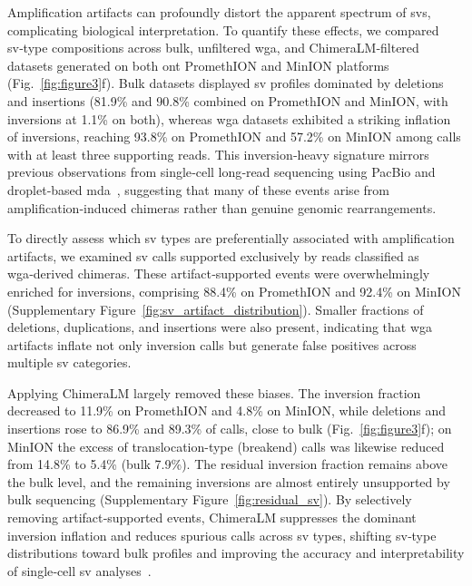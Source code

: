 \documentclass[pdflatex,lineno]{sn-jnl}%
\newif\ifrevisedtext
\newcommand{\chg}[1]{\ifrevisedtext\textcolor{revcolor}{#1}\else#1\fi}
\begin{document}
Amplification artifacts can profoundly distort the apparent spectrum of \glspl{sv}, complicating biological interpretation.
To quantify these effects, we compared \gls{sv}‑type compositions across bulk, unfiltered \gls{wga}, and ChimeraLM‑filtered datasets generated on both \gls{ont} PromethION and MinION platforms (Fig.~\ref{fig:figure3}f).
Bulk datasets displayed \gls{sv} profiles dominated by deletions and insertions\chg{ (81.9\% and 90.8\% combined on PromethION and MinION, with inversions at 1.1\% on both)}, whereas \gls{wga} datasets exhibited a striking inflation of inversions, reaching \chg{93.8\% on PromethION and 57.2\% on MinION among calls with at least three supporting reads}.
This inversion‑heavy signature mirrors previous observations from single‑cell long‑read sequencing using PacBio and droplet‑based \gls{mda}~\cite{hardLongreadWholegenomeAnalysis2023a}, suggesting that many of these events arise from amplification‑induced chimeras rather than genuine genomic rearrangements.

To directly assess which \gls{sv} types are preferentially associated with amplification artifacts, we examined \gls{sv} calls supported exclusively by reads classified as \gls{wga}‑derived chimeras.
These artifact‑supported events were overwhelmingly enriched for inversions, comprising 88.4\% on PromethION and 92.4\% on MinION (Supplementary Figure~\ref{fig:sv_artifact_distribution}).
Smaller fractions of deletions, duplications, and insertions were also present, indicating that \gls{wga} artifacts inflate not only inversion calls but generate false positives across multiple \gls{sv} categories.

Applying ChimeraLM \chg{largely removed} these biases.
\chg{The inversion fraction decreased to 11.9\% on PromethION and 4.8\% on MinION, while deletions and insertions rose to 86.9\% and 89.3\% of calls, close to bulk (Fig.~\ref{fig:figure3}f); on MinION the excess of translocation-type (breakend) calls was likewise reduced from 14.8\% to 5.4\% (bulk 7.9\%).
	The residual inversion fraction remains above the bulk level, and the remaining inversions are almost entirely unsupported by bulk sequencing (Supplementary Figure~\ref{fig:residual_sv}).}
By selectively removing artifact‑supported events, ChimeraLM suppresses the dominant inversion inflation and reduces spurious calls across \gls{sv} types, shifting \gls{sv}‑type distributions toward bulk profiles and improving the accuracy and interpretability of single‑cell \gls{sv} analyses~\cite{hardLongreadWholegenomeAnalysis2023a}.
\end{document}

